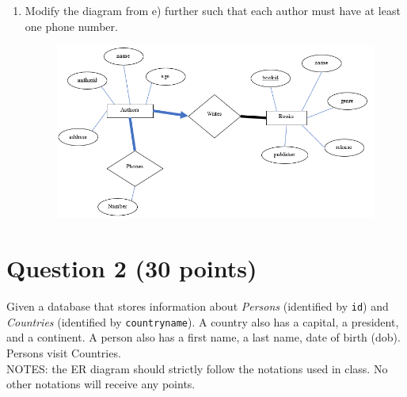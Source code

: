 \documentclass[letterpaper, 11pt]{article}
\begin{document}
\begin{enumerate}[label={\alph*}),leftmargin=*]
\begin{figure}[H]
    \end{figure}
    \item Modify the diagram from e) further such that each author must have at least one phone number.
    \begin{figure}[H]
        \centering
        \includegraphics[scale=0.7]{hw2-1f.png}
    \end{figure}
\end{enumerate}

\section*{Question 2 (30 points)}

Given a database that stores information about \textit{Persons} (identified by \texttt{id}) and \textit{Countries} (identified by \texttt{countryname}). A country also has a capital, a president, and a continent. A person also has a first name, a last name, date of birth (dob). Persons visit Countries.\\
NOTES: the ER diagram should strictly follow the notations used in class. No other notations will receive any points.
\end{document}
